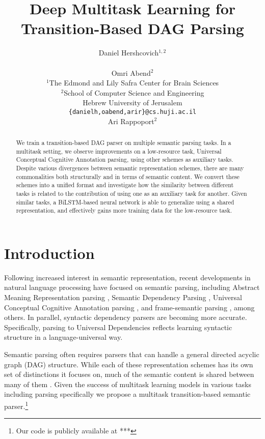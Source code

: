 \documentclass[11pt,a4paper]{article}
\title{Deep Multitask Learning for Transition-Based DAG Parsing}
\author{Daniel Hershcovich$^{1,2}$ \\
  \\\And
  Omri Abend$^2$ \\
  $^1$The Edmond and Lily Safra Center for Brain Sciences \\
  $^2$School of Computer Science and Engineering \\
  Hebrew University of Jerusalem \\
  \texttt{\{danielh,oabend,arir\}@cs.huji.ac.il}
  \\\And
  Ari Rappoport$^2$
}
\date{}
\begin{document}
\maketitle
\begin{abstract}
  We train a transition-based DAG parser on multiple semantic parsing tasks.
  In a multitask setting, we observe improvements on a low-resource task,
  Universal Conceptual Cognitive Annotation parsing, using other schemes
  as auxiliary tasks.
  Despite various divergences between semantic representation schemes,
  there are many commonalities both structurally and in terms of semantic content.
  We convert these schemes into a unified format and investigate how
  the similarity between different tasks is related to the contribution of
  using one as an auxiliary task for another.
  Given similar tasks, a BiLSTM-based neural network is able to generalize
  using a shared representation, and effectively gains more training data
  for the low-resource task.
\end{abstract}

\section{Introduction}\label{sec:introduction}

Following increased interest in semantic representation,
recent developments in natural language processing have focused on semantic parsing, including
Abstract Meaning Representation parsing \cite[AMR;][]{banarescu2013abstract,damonte-17,11099},
Semantic Dependency Parsing \cite[SDP;][]{oepen2015semeval,P17-1186},
Universal Conceptual Cognitive Annotation parsing \cite[UCCA;][]{abend2013universal,hershcovich2017a},
and frame-semantic parsing \cite{gildea2002automatic,swayamdipta2017frame,ringgaard2017sling},
among others.
In parallel, syntactic dependency parsers are becoming more accurate.
Specifically, parsing to Universal Dependencies \cite[UD;][]{nivre2016universal,dozat2016deep}
reflects learning syntactic structure in a language-universal way.

Semantic parsing often requires parsers that can handle a general directed acyclic graph (DAG)
structure.
While each of these representation schemes has its own set of distinctions it focuses on,
much of the semantic content is shared between many of them \cite{abend2017state}.
Given the success of multitask learning models in various tasks
\cite{collobert2008unified,luong2015multi,ruder2017overview}
including parsing specifically
\cite{Zhang2016StackpropagationIR,P17-1186,swayamdipta2017frame,guo2016exploiting}
we propose a multitask transition-based semantic parser.\footnote{Our code is publicly available at ***}
\end{document}
